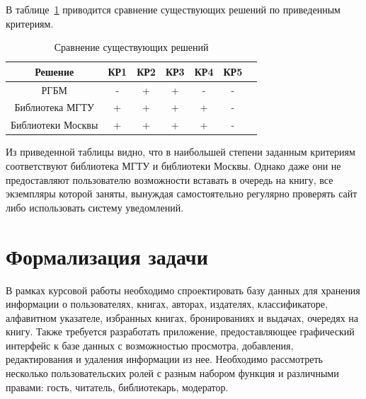 В таблице~\ref{tbl:versus} приводится сравнение существующих решений по приведенным критериям.

\begin{table}[H]
    \begin{center}
        \caption{Сравнение существующих решений}
        \begin{tabular}{|c|c|c|c|c|c|c|}
            \hline
            \textbf{Решение} & \textbf{КР1} & \textbf{КР2} & \textbf{КР3} & \textbf{КР4} & \textbf{КР5}\\
            \hline
            РГБМ & - & + & + & - & - \\
            \hline
            Библиотека МГТУ & + & + & + & + & - \\
            \hline
            Библиотеки Москвы & + & + & + & + & - \\
            \hline
        \end{tabular}
        \label{tbl:versus}
    \end{center}
\end{table}

Из приведенной таблицы видно, что в наибольшей степени заданным критериям соответствуют библиотека МГТУ и библиотеки Москвы. Однако даже они не предоставляют пользователю возможности вставать в очередь на книгу, все экземпляры которой заняты, вынуждая самостоятельно регулярно проверять сайт либо использовать систему уведомлений. 

\section{Формализация задачи}
В рамках курсовой работы необходимо спроектировать базу данных для хранения информации о пользователях, книгах, авторах, издателях, классификаторе, алфавитном указателе, избранных книгах, бронированиях и выдачах, очередях на книгу. Также требуется разработать приложение, предоставляющее графический интерфейс к базе данных с возможностью просмотра, добавления, редактирования и удаления информации из нее. Необходимо рассмотреть несколько пользовательских ролей с разным набором функция и различными правами: гость, читатель, библиотекарь, модератор.

